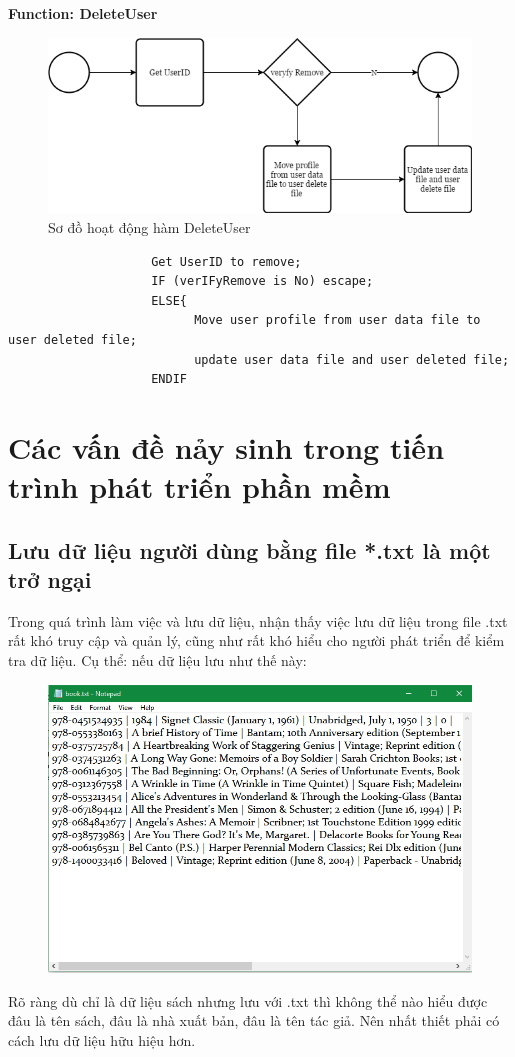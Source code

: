 \documentclass[12pt,a4paper]{report}
\begin{document}
                \textbf{Function: DeleteUser}
                \begin{figure}[H]
                    \centering
                    \label{F:deleteuser}
                    \includegraphics[scale = .4]{deleteuser.png}
                    \caption{Sơ đồ hoạt động hàm DeleteUser}
                \end{figure}
                \begin{verbatim}
                    Get UserID to remove;
                    IF (verIFyRemove is No) escape;
                    ELSE{
                          Move user profile from user data file to user deleted file;
                          update user data file and user deleted file;
                    ENDIF
                \end{verbatim}
\chapter{Các vấn đề nảy sinh trong tiến trình phát triển phần mềm}
    \section{Lưu dữ liệu người dùng bằng file *.txt là một trở ngại}
    Trong quá trình làm việc và lưu dữ liệu, nhận thấy việc lưu dữ liệu trong file .txt rất khó truy cập và quản lý, cũng như rất khó hiểu cho người phát triển để kiểm tra dữ liệu. Cụ thể: nếu dữ liệu lưu như thế này:
        \begin{figure}[H]
            \centering
            \label{F:booktext}
            \includegraphics[scale = .7]{booktext.png}
        \end{figure}
    Rõ ràng dù chỉ là dữ liệu sách nhưng lưu với .txt thì không thể nào hiểu được đâu là tên sách, đâu là nhà xuất bản, đâu là tên tác giả. Nên nhất thiết phải có cách lưu dữ liệu hữu hiệu hơn.\\
\end{document}

